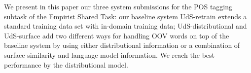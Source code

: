 We present in this paper our three system submissions for the POS tagging subtask of the Empirist Shared Task: our baseline system UdS-retrain extends a standard training data set with in-domain training data; UdS-distributional and UdS-surface add two different ways for handling OOV words on top of the baseline system by using either distributional information or a combination of surface similarity and language model information. We reach the best performance by the distributional model.
